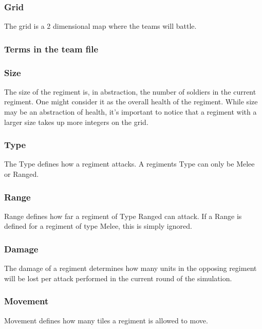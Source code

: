 		\subsubsection{Grid}
		The grid is a 2 dimensional map where the teams will battle.		
		
																		
		\subsubsection{Terms in the team file }
	
		\subsubsection{Size}
		The size of the regiment is, in abstraction, the number of soldiers in the current regiment. 
		One might consider it as the overall health of the regiment. While size may be an abstraction of health, 
		it's important to notice that a regiment with a larger size takes up more integers on the grid.
		
		\subsubsection{Type}
		The Type defines how a regiment attacks. A regiments Type can only be Melee or Ranged.
		
		\subsubsection{Range}
		Range defines how far a regiment of Type Ranged can attack. 
		If a Range is defined for a regiment of type Melee, this is simply ignored.
		
		\subsubsection{Damage}
		The damage of a regiment determines how many units in the opposing regiment 
		will be lost per attack performed in the current round of the simulation.
		
		\subsubsection{Movement}
		Movement defines how many tiles a regiment is allowed to move.
		
